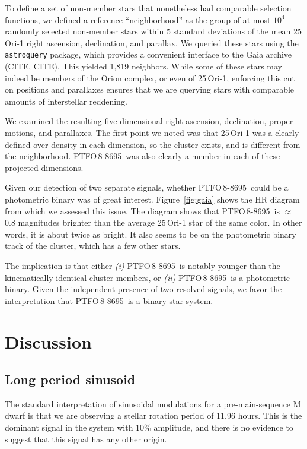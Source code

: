\documentclass[12pt,twocolumn,tighten]{aastex62}
\newcommand{\ptfo}{PTFO$\,$8-8695}
\begin{document}
To define a set of non-member stars that nonetheless had comparable selection
functions, we defined a reference ``neighborhood'' as the group of at
most $10^4$ randomly selected non-member stars within 5 standard
deviations of the mean 25$\,$Ori-1 right ascension, declination, and
parallax.  We queried these stars using the \texttt{astroquery}
package, which provides a convenient interface to the Gaia archive
(CITE, CITE).  This yielded 1{,}819 neighbors.  While some of
these stars may indeed be members of the Orion complex, or even of
25$\,$Ori-1, enforcing this cut on positions and parallaxes ensures
that we are querying stars with comparable amounts of interstellar
reddening.

We examined the resulting five-dimensional right ascension,
declination, proper motions, and parallaxes.  The first point we noted
was that 25$\,$Ori-1 was a clearly defined over-density in each
dimension, so the cluster exists, and is different from the
neighborhood.  \ptfo\ was also clearly a member in each of these
projected dimensions.

Given our detection of two separate signals, whether
\ptfo\ could be a photometric binary was of great interest.
Figure~\ref{fig:gaia} shows the HR diagram from which we assessed
this issue.
The diagram shows that \ptfo\ is $\approx$0.8 magnitudes brighter than the average
25$\,$Ori-1 star of the same color.
In other words, it is about twice as bright.
It also seems to be on the photometric binary track of the cluster, which has a few other stars.

The implication is that either 
{\it (i)} \ptfo\ is notably younger than the kinematically identical cluster members, or
{\it (ii)} \ptfo\ is a photometric binary.
Given the independent presence of two resolved signals,
we favor the interpretation that \ptfo\ is a binary star system.


\section{Discussion}
\label{sec:discussion}

\subsection{Long period sinusoid}

The standard interpretation of sinusoidal modulations for a pre-main-sequence M
dwarf is that we are observing a stellar rotation period of 11.96 hours.  This
is the dominant signal in the system with 10\% amplitude, and there is no
evidence to suggest that this signal has any other origin.
\end{document}
